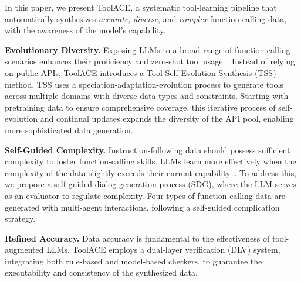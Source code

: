 \documentclass{article}
\begin{document}
In this paper, we present ToolACE, a systematic tool-learning pipeline that automatically synthesizes \textit{accurate}, \textit{diverse}, and \textit{complex} function calling data, with the awareness of the model's capability. 

\noindent
\textbf{Evolutionary Diversity.} 
Exposing LLMs to a broad range of function-calling scenarios enhances their proficiency and zero-shot tool usage~\cite{zhang2024instruction}. Instead of relying on public APIs, ToolACE introduces a Tool Self-Evolution Synthesis (TSS) method. TSS uses a speciation-adaptation-evolution process to generate tools across multiple domains with diverse data types and constraints. Starting with pretraining data to ensure comprehensive coverage, this iterative process of self-evolution and continual updates expands the diversity of the API pool, enabling more sophisticated data generation.

\noindent
\textbf{Self-Guided Complexity.} Instruction-following data should possess sufficient complexity to foster function-calling skills. LLMs learn more effectively when the complexity of the data slightly exceeds their current capability~\cite{du2023mods}. To address this, we propose a self-guided dialog generation process (SDG), where the LLM serves as an evaluator to regulate complexity. 
Four types of function-calling data are generated with multi-agent interactions, following a self-guided complication strategy.

\noindent
\textbf{Refined Accuracy.} Data accuracy is fundamental to the effectiveness of tool-augmented LLMs. 
ToolACE employs a dual-layer verification (DLV) system, integrating both rule-based and model-based checkers, to guarantee the executability and consistency of the synthesized data.
\end{document}
